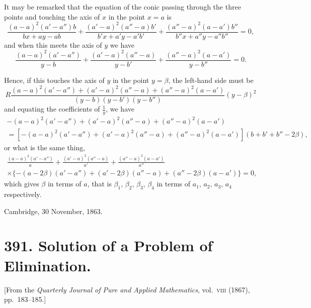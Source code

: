 \documentclass[11pt,a4paper]{article}
\theoremstyle{plain}
\begin{document}
\newpage
\setcounter{equation}{33}

It may be remarked that the equation of the conic passing through the three points and touching the axis of $x$ in the point $x = a$ is
\begin{equation}
\frac{(a-a)^2(a'-a'')b}{bx+ay-ab} + \frac{(a'-a)^2(a''-a)b'}{b'x+a'y-a'b'} + \frac{(a''-a)^2(a-a')b''}{b''x+a''y-a''b''} = 0,
\end{equation}
and when this meets the axis of $y$ we have
\begin{equation}
\frac{(a-a)^2(a'-a'')}{y-b} + \frac{(a'-a)^2(a''-a)}{y-b'} + \frac{(a''-a)^2(a-a')}{y-b''} = 0.
\end{equation}

Hence, if this touches the axis of $y$ in the point $y = \beta$, the left-hand side must be
\begin{equation}
R\frac{(a-a)^2(a'-a'') + (a'-a)^2(a''-a) + (a''-a)^2(a-a')}{(y-b)(y-b')(y-b'')}(y-\beta)^2
\end{equation}
and equating the coefficients of $\frac{1}{y}$, we have
\begin{multline}
-(a-a)^2(a'-a'') + (a'-a)^2(a''-a) + (a''-a)^2(a-a') \\
= [-(a-a)^2(a'-a'') + (a'-a)^2(a''-a) + (a''-a)^2(a-a')](b+b'+b''-2\beta),
\end{multline}
or what is the same thing,
\begin{multline}
\frac{(a-a)^2(a'-a'')}{a} + \frac{(a'-a)^2(a''-a)}{a'} + \frac{(a''-a)^2(a-a')}{a''} \\
\times \{-(a-2\beta)(a'-a'') + (a'-2\beta)(a''-a) + (a''-2\beta)(a-a')\} = 0,
\end{multline}
which gives $\beta$ in terms of $a$, that is $\beta_1$, $\beta_2$, $\beta_3$, $\beta_4$ in terms of $a_1$, $a_2$, $a_3$, $a_4$ respectively.

\begin{flushright}
Cambridge, 30 November, 1863.
\end{flushright}

\newpage

\section*{391. Solution of a Problem of Elimination.}
\label{sec:391}
\begin{center}
[From the \textit{Quarterly Journal of Pure and Applied Mathematics}, vol.~\textsc{viii} (1867), pp.~183--185.]
\end{center}
\end{document}
